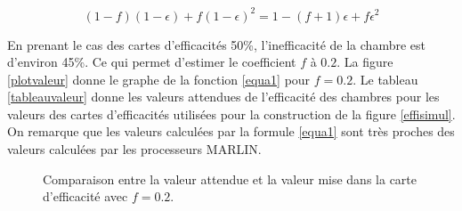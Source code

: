 \begin{equation}
(1-f)(1-\epsilon)+f(1-\epsilon)^2=1-(f+1)\epsilon+f\epsilon^2 \label{equa1}
\end{equation}

En prenant le cas des cartes d'efficacités 50\%, l'inefficacité de la chambre est d'environ 45\%. Ce qui permet d'estimer le coefficient $f$ à $0.2$. La figure \ref{plotvaleur} donne le graphe de la fonction \ref{equa1} pour $f=0.2$. Le tableau \ref{tableauvaleur} donne les valeurs attendues de l'efficacité des chambres pour les valeurs des cartes d'efficacités utilisées pour la construction de la figure \ref{effisimul}. On remarque que les valeurs calculées par la formule \ref{equa1} sont très proches des valeurs calculées par les processeurs MARLIN.

	\begin{figure}[ht!]
    \hfill
	\caption{Comparaison entre la valeur attendue et la valeur mise dans la carte d'efficacité avec $f=0.2$. }
	\label{Comparaison}
\end{figure}

